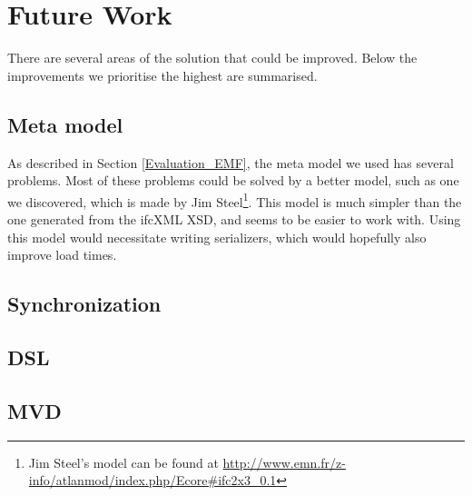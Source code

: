 \section{Future Work}
\label{sec:future_work}
There are several areas of the solution that could be improved. Below the improvements we prioritise the highest are summarised. 
\subsection{Meta model}
As described in Section \ref{Evaluation_EMF}, the meta model we used has several problems. Most of these problems could be solved by a better model, such as one we discovered, which is made by Jim Steel\footnote{Jim Steel's model can be found at \url{http://www.emn.fr/z-info/atlanmod/index.php/Ecore#ifc2x3_0.1}}. This model is much simpler than the one generated from the ifcXML XSD, and seems to be easier to work with. Using this model would necessitate writing serializers, which would hopefully also improve load times.
\subsection{Synchronization}
\subsection{DSL}
\subsection{MVD}
